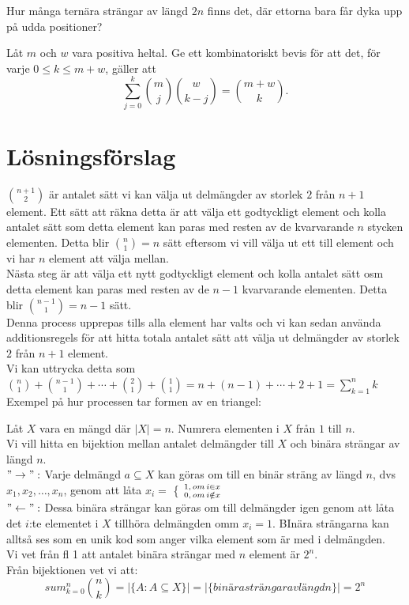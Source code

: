 \documentclass[nobib]{tufte-handout}
\begin{document}
\begin{xca}
  Hur många ternära strängar av längd $2n$ finns det, där ettorna bara får dyka upp på udda positioner?
\end{xca}

\begin{xca}
  Låt $m$ och $w$ vara positiva heltal. Ge ett kombinatoriskt bevis för att det, för varje $0 \leq k \leq m + w$, gäller att
  $$\sum_{j=0}^k \binom{m}{j}\binom{w}{k-j} = \binom{m + w}{k}.$$
\end{xca}

\newpage
\section{Lösningsförslag}

\begin{xca}
$\binom{n+1}{2}$ är antalet sätt vi kan välja ut delmängder av storlek $2$ från $n+1$ element. Ett sätt att räkna detta är att välja ett godtyckligt element och kolla antalet sätt som detta element kan paras med resten av de kvarvarande $n$ stycken elementen. Detta blir $\binom{n}{1}=n$ sätt eftersom vi vill välja ut ett till element och vi har $n$ element att välja mellan.\\
Nästa steg är att välja ett nytt godtyckligt element och kolla antalet sätt osm detta element kan paras med resten av de $n-1$ kvarvarande elementen. Detta blir $\binom{n-1}{1}=n-1$ sätt.\\ Denna process upprepas tills alla element har valts och vi kan sedan använda additionsregels för att hitta totala antalet sätt att välja ut delmängder av storlek $2$ från $n+1$ element. \\
Vi kan uttrycka detta som $\binom{n}{1}+\binom{n-1}{1}+\cdots + \binom{2}{1}+\binom{1}{1}=n+(n-1)+\cdots +2+1=\sum_{k=1}^nk$\\
Exempel på hur processen tar formen av en triangel:
\end{xca}


\begin{xca}
Låt $X$ vara en mängd där $|X|=n$. Numrera elementen i $X$ från $1$ till $n$.\\

Vi vill hitta en bijektion mellan antalet delmängder till $X$ och binära strängar av längd $n$.\\
$"\rightarrow": $ Varje delmängd $ a\subseteq X $ kan göras om till en binär sträng av längd $n$, dvs $x_1,x_2,\ldots , x_n$, genom att låta $x_i=$ \Big \{ ${1,\, om \, i\in x \atop 0, \, om\, i \notin x}$ \\
$"\leftarrow": $ Dessa binära strängar kan göras om till delmängder igen genom att låta det $i$:te elementet i $X$ tillhöra delmängden omm $x_i=1$. BInära strängarna kan alltså ses som en unik kod som anger vilka element som är med i delmängden.\\

Vi vet från fl 1 att antalet binära strängar med $n$ element är $2^n$.\\
Från bijektionen vet vi att: $$sum_{k=0}^n\binom{n}{k}=|\{A:A\subseteq X\}|=|\{binära strängar av längd n\}|=2^n$$
\end{xca}
\end{document}
